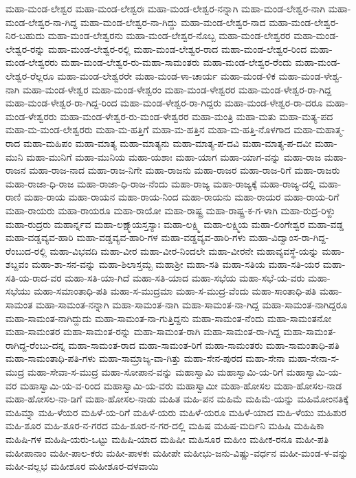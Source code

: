 ಮಹಾ-ಮಂಡ-ಲೇಶ್ವರ
ಮಹಾ-ಮಂಡ-ಲೇಶ್ವರಃ
ಮಹಾ-ಮಂಡ-ಲೇಶ್ವರ-ನನ್ನಾಗಿ
ಮಹಾ-ಮಂಡ-ಲೇಶ್ವರ-ನಾಗಿ
ಮಹಾ-ಮಂಡ-ಲೇಶ್ವರ-ನಾ-ಗಿದ್ದ
ಮಹಾ-ಮಂಡ-ಲೇಶ್ವರ-ನಾ-ಗಿದ್ದು
ಮಹಾ-ಮಂಡ-ಲೇಶ್ವರ-ನಾದ
ಮಹಾ-ಮಂಡ-ಲೇಶ್ವರ-ನಿರ-ಬಹುದು
ಮಹಾ-ಮಂಡ-ಲೇಶ್ವರನು
ಮಹಾ-ಮಂಡ-ಲೇಶ್ವರ-ನೊಬ್ಬ
ಮಹಾ-ಮಂಡ-ಲೇಶ್ವರರ
ಮಹಾ-ಮಂಡ-ಲೇಶ್ವರ-ರನ್ನು
ಮಹಾ-ಮಂಡ-ಲೇಶ್ವರ-ರಲ್ಲಿ
ಮಹಾ-ಮಂಡ-ಲೇಶ್ವರ-ರಾದ
ಮಹಾ-ಮಂಡ-ಲೇಶ್ವರ-ರಿಂದ
ಮಹಾ-ಮಂಡ-ಲೇಶ್ವರರು
ಮಹಾ-ಮಂಡ-ಲೇಶ್ವರ-ರು-ಮಹಾ-ಸಾಮಂತರು
ಮಹಾ-ಮಂಡ-ಲೇಶ್ವರ-ರೆಂದು
ಮಹಾ-ಮಂಡ-ಲೇಶ್ವರ-ರೆಲ್ಲರೂ
ಮಹಾ-ಮಂಡ-ಲೇಶ್ವರರೇ
ಮಹಾ-ಮಂಡ-ಳಾ-ಚಾರ್ಯ
ಮಹಾ-ಮಂಡ-ಳಿಕ
ಮಹಾ-ಮಂಡ-ಳೇಶ್ವ-ನಾಗಿ
ಮಹಾ-ಮಂಡ-ಳೇಶ್ವರ
ಮಹಾ-ಮಂಡ-ಳೇಶ್ವರಂ
ಮಹಾ-ಮಂಡ-ಳೇಶ್ವರರ
ಮಹಾ-ಮಂಡ-ಳೇಶ್ವರ-ರಾ-ಗಿದ್ದ
ಮಹಾ-ಮಂಡ-ಳೇಶ್ವರ-ರಾ-ಗಿದ್ದ-ರಿಂದ
ಮಹಾ-ಮಂಡ-ಳೇಶ್ವರ-ರಾ-ಗಿದ್ದರು
ಮಹಾ-ಮಂಡ-ಳೇಶ್ವರ-ರಾ-ದರೂ
ಮಹಾ-ಮಂಡ-ಳೇಶ್ವರರು
ಮಹಾ-ಮಂಡ-ಳೇಶ್ವರ-ರು-ಮಂಡ-ಳೇಶ್ವರರ
ಮಹಾ-ಮಂತ್ರಿ
ಮಹಾ-ಮತು
ಮಹಾ-ಮತ್ಯ-ಪದ
ಮಹಾ-ಮ-ಮಂಡ-ಲೇಶ್ವರರು
ಮಹಾ-ಮ-ಹತ್ತಿಗೆ
ಮಹಾ-ಮ-ಹತ್ತಿನ
ಮಹಾ-ಮ-ಹತ್ತಿ-ನೊಳಗಾದ
ಮಹಾ-ಮಹಾತ್ಮ-ರಾದ
ಮಹಾ-ಮಹಿಪಂ
ಮಹಾ-ಮಾತ್ಯ
ಮಹಾ-ಮಾತ್ಯನು
ಮಹಾ-ಮಾತ್ಯ-ಪ-ದವಿ
ಮಹಾ-ಮಾತ್ಯ-ಪ-ದವೀ
ಮಹಾ-ಮುನಿ
ಮಹಾ-ಮುನಿಗೆ
ಮಹಾ-ಮುನಿಯ
ಮಹಾ-ಯಶಾಃ
ಮಹಾ-ಯಾಗ
ಮಹಾ-ಯಾಗ-ವನ್ನು
ಮಹಾ-ರಾಜ
ಮಹಾ-ರಾಜನ
ಮಹಾ-ರಾಜ-ನಾದ
ಮಹಾ-ರಾಜ-ನಿಗೇ
ಮಹಾ-ರಾಜನು
ಮಹಾ-ರಾಜರ
ಮಹಾ-ರಾಜ-ರಿಗೆ
ಮಹಾ-ರಾಜರು
ಮಹಾ-ರಾಜಾ-ಧಿ-ರಾಜ
ಮಹಾ-ರಾಜಾ-ಧಿ-ರಾಜ-ನೆಂದು
ಮಹಾ-ರಾಜ್ಯ
ಮಹಾ-ರಾಜ್ಯಕ್ಕೆ
ಮಹಾ-ರಾಜ್ಯ-ದಲ್ಲಿ
ಮಹಾ-ರಾಣಿ
ಮಹಾ-ರಾಯ
ಮಹಾ-ರಾಯನ
ಮಹಾ-ರಾಯ-ನಿಂದ
ಮಹಾ-ರಾಯನು
ಮಹಾ-ರಾಯರ
ಮಹಾ-ರಾಯ-ರಿಗೆ
ಮಹಾ-ರಾಯರು
ಮಹಾ-ರಾಯರೂ
ಮಹಾ-ರಾಯೋ
ಮಹಾ-ರಾಷ್ಟ್ರ
ಮಹಾ-ರಾಷ್ಟ್ರ-ಕ-ಗ-ಳಾಗಿ
ಮಹಾ-ರುದ್ರ-ರಿಳ್ದು
ಮಹಾ-ರುದ್ರರು
ಮಹಾರ್ನ್ನವ
ಮಹಾ-ಲಕ್ಷ್ಮಾ್ಯಸ್ತಸ್ಯಾಃ
ಮಹಾ-ಲಕ್ಷ್ಮಿ
ಮಹಾ-ಲಕ್ಷ್ಮಿಯ
ಮಹಾ-ಲಿಂಗೇಶ್ವರ
ಮಹಾ-ವಡ್ಡ
ಮಹಾ-ವಡ್ಡವ್ಯವ-ಹಾರಿ
ಮಹಾ-ವಡ್ಡವ್ಯವ-ಹಾರಿ-ಗಳ
ಮಹಾ-ವಡ್ಡವ್ಯವ-ಹಾರಿ-ಗಳು
ಮಹಾ-ವಿದ್ವಾಂಸ-ರಾ-ಗಿದ್ದ-ರೆಂಬುದ-ರಲ್ಲಿ
ಮಹಾ-ವಿಭವದಿ
ಮಹಾ-ವೀರ
ಮಹಾ-ವೀರ-ನಿಂದಲೇ
ಮಹಾ-ವೀರನೇ
ಮಹಾವ್ಯವಸ್ಥೆ-ಯನ್ನು
ಮಹಾ-ಶಬ್ದವಂ
ಮಹಾ-ಶಾ-ಸನ-ವನ್ನು
ಮಹಾ-ಶಿಲಾಸ್ತಮ್ಬ
ಮಹಾಶ್ರೀ
ಮಹಾ-ಸತಿ
ಮಹಾ-ಸತಿಯ
ಮಹಾ-ಸತಿ-ಯರ
ಮಹಾ-ಸತಿ-ಯ-ರಾದ-ವರ
ಮಹಾ-ಸತಿ-ಯಾ-ಗಿದೆ
ಮಹಾ-ಸತಿ-ಯಾದ
ಮಹಾ-ಸಭೆಯ
ಮಹಾ-ಸಭೆ-ಯ-ವರು
ಮಹಾ-ಸಭೆಯು
ಮಹಾ-ಸಮಾಂತಾಧಿ-ಪತಿ
ಮಹಾ-ಸ-ಮುದ್ರಮಾ
ಮಹಾ-ಸ-ಮುದ್ರ-ವೆಂದು
ಮಹಾ-ಸಾಂತಾಧಿ-ಪತಿ
ಮಹಾ-ಸಾಮಂತ
ಮಹಾ-ಸಾಮಂತ-ನನ್ನಾಗಿ
ಮಹಾ-ಸಾಮಂತ-ನಾಗಿ
ಮಹಾ-ಸಾಮಂತ-ನಾ-ಗಿದ್ದ
ಮಹಾ-ಸಾಮಂತ-ನಾಗಿದ್ದರೂ
ಮಹಾ-ಸಾಮಂತ-ನಾಗಿದ್ದುದು
ಮಹಾ-ಸಾಮಂತ-ನಾ-ಗುತ್ತಿದ್ದನು
ಮಹಾ-ಸಾಮಂತ-ನೆಂದು
ಮಹಾ-ಸಾಮಂತನೋ
ಮಹಾ-ಸಾಮಂತರ
ಮಹಾ-ಸಾಮಂತ-ರನ್ನು
ಮಹಾ-ಸಾಮಂತ-ರಾಗಿ
ಮಹಾ-ಸಾಮಂತ-ರಾ-ಗಿದ್ದ
ಮಹಾ-ಸಾಮಂತ-ರಾಗಿದ್ದ-ರೆಂಬು-ದನ್ನ
ಮಹಾ-ಸಾಮಂತ-ರಾದ
ಮಹಾ-ಸಾಮಂತ-ರಿಗೆ
ಮಹಾ-ಸಾಮಂತರು
ಮಹಾ-ಸಾಮಂತಾಧಿ-ಪತಿ
ಮಹಾ-ಸಾಮಂತಾಧಿ-ಪತಿ-ಗಳು
ಮಹಾ-ಸಾಮ್ರಾಜ್ಯ-ವಾ-ಗಿತ್ತು
ಮಹಾ-ಸೇನ-ಪುರದ
ಮಹಾ-ಸೇನಾ
ಮಹಾ-ಸೇನಾ-ಸ-ಮುದ್ರ
ಮಹಾ-ಸೇವಾ-ಸ-ಮುದ್ರ
ಮಹಾ-ಸೋಪಾನ-ವನ್ನು
ಮಹಾಸ್ವಾಮಿ
ಮಹಾಸ್ವಾಮಿ-ಯ-ರಿಗೆ
ಮಹಾಸ್ವಾಮಿ-ಯ-ವರ
ಮಹಾಸ್ವಾಮಿ-ಯ-ವ-ರಿಂದ
ಮಹಾಸ್ವಾಮಿ-ಯ-ವರು
ಮಹಾಸ್ವಾಮೀ
ಮಹಾ-ಹೋಸಲ
ಮಹಾ-ಹೋಸಲ-ನಾಡ
ಮಹಾ-ಹೋಸಲ-ನಾ-ಡಿಗೆ
ಮಹಾ-ಹೋಸಲ-ನಾಡು
ಮಹಿತ
ಮಹಿ-ಪನ
ಮಹಿಮೆ
ಮಹಿಮೆ-ಯನ್ನು
ಮಹಿಮೋಂನತಿಕ್ಕೆ
ಮಹಿಮ್ನಾ
ಮಹಿ-ಳೆಯರ
ಮಹಿಳೆ-ಯ-ರಿಗೆ
ಮಹಿಳೆ-ಯರು
ಮಹಿಳೆ-ಯರೂ
ಮಹಿಳೆ-ಯಾದ
ಮಹಿ-ಳೆಯು
ಮಹಿಶುರ
ಮಹಿ-ಶೂರ
ಮಹಿ-ಶೂರ-ನ-ಗರದ
ಮಹಿ-ಶೂರ-ನ-ಗರ-ದಲ್ಲಿ
ಮಹಿಷ
ಮಹಿಷ-ಮರ್ದಿನಿ
ಮಹಿಷಿ
ಮಹಿಷಿಕಾ
ಮಹಿಷಿ-ಗಳ
ಮಹಿಷಿ-ಯರು-ಒಟ್ಟು
ಮಹಿಷಿ-ಯಾದ
ಮಹಿಷೀ
ಮಹಿಸೂರ
ಮಹೀಂ
ಮಹೀಕ-ರನೂ
ಮಹೀ-ಪತಿ
ಮಹೀಪಾನಾಂ
ಮಹೀ-ಪಾಲ-ಕರು
ಮಹೀ-ಪಾಳಕಃ
ಮಹೀಪೇ
ಮಹೀಭು-ಜನು-ವಿಷ್ಣು-ವರ್ಧನ
ಮಹೀ-ಮಂಡ-ಳ-ವನ್ನು
ಮಹೀ-ವಲ್ಲಭ
ಮಹೀಶೂರ
ಮಹೀಶೂರ-ದಳವಾಯಿ
